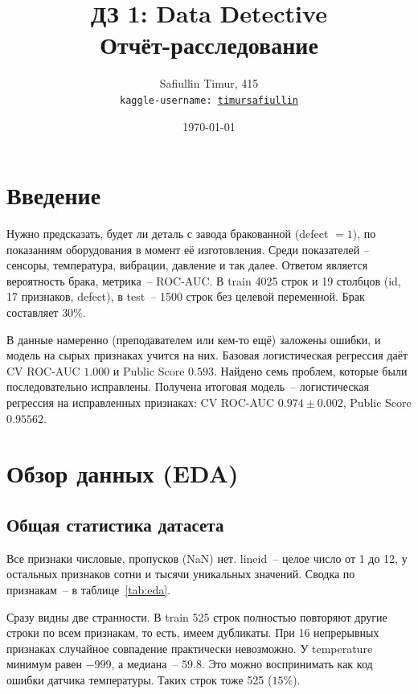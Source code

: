 \documentclass[11pt,a4paper,twocolumn]{article}
\title{
    \vspace{-2cm}
    \textbf{ДЗ 1: Data Detective} \\
    \large Отчёт-расследование
}
\author{
    Safiullin Timur, 415 \\
    \texttt{kaggle-username: \href{https://www.kaggle.com/timursafiullin}{timursafiullin}}
}
\date{\today}
\newcommand{\f}[1]{{\ttfamily\def\_{\textunderscore\allowbreak}#1}}
\begin{document}
\maketitle

\section{Введение}

Нужно предсказать, будет ли деталь с завода бракованной (\f{defect} $=1$), по показаниям оборудования в момент её изготовления. Среди показателей – сенсоры, температура, вибрации, давление и так далее. Ответом является вероятность брака, метрика~-- ROC-AUC. В \f{train} 4025 строк и 19 столбцов (\f{id}, 17 признаков, \f{defect}), в \f{test}~-- 1500 строк без целевой переменной. Брак составляет $30\%$.

В данные намеренно (преподавателем или кем-то ещё) заложены ошибки, и модель на сырых признаках учится на них. Базовая логистическая регрессия даёт CV ROC-AUC $1.000$ и Public Score $0.593$. Найдено семь проблем, которые были последовательно исправлены. Получена итоговая модель~-- логистическая регрессия на исправленных признаках: CV ROC-AUC $0.974 \pm 0.002$, Public Score $0.95562$.

\section{Обзор данных (EDA)}
\label{sec:eda}

\subsection{Общая статистика датасета}

Все признаки числовые, пропусков (NaN) нет. \f{line\_id}~-- целое число от 1 до 12, у остальных признаков сотни и тысячи уникальных значений. Сводка по признакам~-- в таблице~\ref{tab:eda}.

Сразу видны две странности. В \f{train} 525 строк полностью повторяют другие строки по всем признакам, то есть, имеем дубликаты. При 16 непрерывных признаках случайное совпадение практически невозможно. У \f{temperature} минимум равен $-999$, а медиана~-- $59.8$. Это можно воспринимать как код ошибки датчика температуры. Таких строк тоже 525 ($15\%$).
\end{document}

